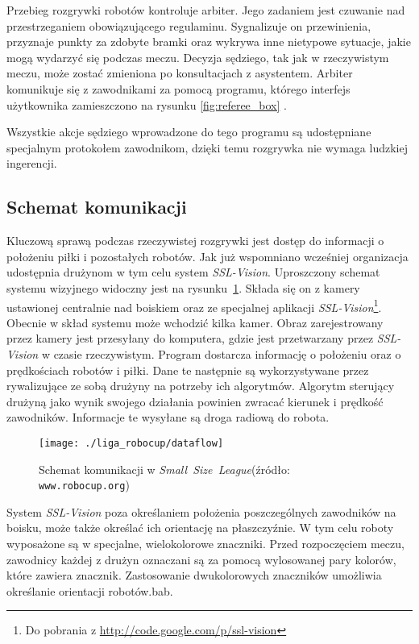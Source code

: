 	Przebieg rozgrywki robotów kontroluje arbiter. Jego zadaniem jest czuwanie nad przestrzeganiem obowiązującego regulaminu. Sygnalizuje on przewinienia, przyznaje punkty za zdobyte bramki
	oraz wykrywa inne nietypowe sytuacje, jakie mogą wydarzyć się podczas meczu. Decyzja sędziego, tak jak w rzeczywistym meczu, może zostać zmieniona po konsultacjach z asystentem.
	Arbiter komunikuje się z zawodnikami za pomocą programu, którego interfejs użytkownika zamieszczono na rysunku \ref{fig:referee_box} .

	Wszystkie akcje sędziego wprowadzone do tego programu są udostępniane specjalnym protokołem zawodnikom, dzięki temu rozgrywka nie wymaga ludzkiej ingerencji.
	\subsection{Schemat komunikacji}
	Kluczową sprawą podczas rzeczywistej rozgrywki jest dostęp do informacji o położeniu piłki
	i pozostałych robotów. Jak już wspomniano wcześniej organizacja udostępnia drużynom w tym celu system \textit{SSL-Vision}. Uproszczony schemat systemu
	wizyjnego widoczny jest na rysunku~\ref{fig:comunication}.
	Składa się on z kamery ustawionej centralnie nad boiskiem oraz ze specjalnej aplikacji \mbox{\emph{SSL-Vision}}\footnote{ Do pobrania z \url{http://code.google.com/p/ssl-vision}}.
	Obecnie w skład systemu może wchodzić kilka kamer.
	Obraz zarejestrowany przez kamery jest przesyłany do komputera, gdzie jest przetwarzany przez \emph{SSL-Vision} w czasie rzeczywistym. Program dostarcza informację 
	o położeniu oraz o prędkościach robotów i piłki. Dane te następnie są wykorzystywane przez rywalizujące ze sobą drużyny na potrzeby ich algorytmów.
	Algorytm sterujący drużyną jako wynik swojego działania powinien zwracać kierunek i prędkość zawodników. Informacje te wysyłane są droga radiową do robota.
	\begin{figure}[H]
	\centering
	\texttt{[image: ./liga\_robocup/dataflow]}
	\caption{Schemat komunikacji w  \mbox{\emph{Small Size League}}\newline(źródło: \texttt{www.robocup.org}) }
	\label{fig:comunication}
	\end{figure} 	
	System \mbox{\emph{SSL-Vision}} poza określaniem położenia poszczególnych zawodników na boisku, może także określać ich orientację na
	płaszczyźnie. W tym celu roboty wyposażone są w specjalne, wielokolorowe znaczniki. Przed rozpoczęciem meczu, zawodnicy każdej z drużyn oznaczani są za pomocą wylosowanej pary kolorów, 
	które zawiera znacznik. Zastosowanie dwukolorowych znaczników umożliwia określanie orientacji robotów.bab.

